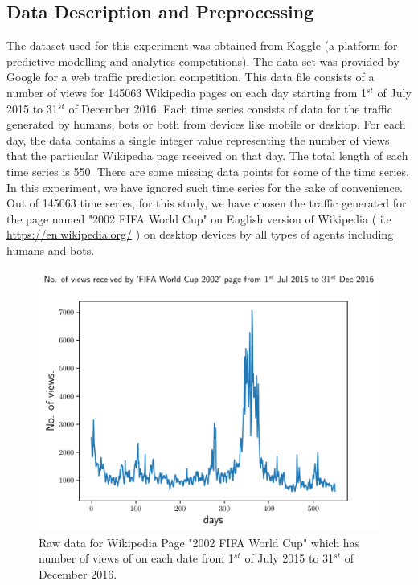 
  
  \subsection{Data Description and Preprocessing}
  
  \indent \indent
  		The dataset used for this experiment was obtained from Kaggle (a platform for predictive modelling and analytics competitions). The data set was provided by Google for a web traffic prediction competition.
		 This data file consists of  a number of views for 145063 Wikipedia pages on each day starting from 1$^{st}$ of July 2015 to 31$^{st}$ of December 2016. Each time series consists of data for the traffic generated by humans, bots or both from devices like mobile or desktop.
		 For each day, the data contains a single integer value representing the number of views that the particular Wikipedia page received on that day.  The total length of each time series is 550. There are some missing data points for some of the time series. In this experiment, we have ignored such time series for the sake of convenience. Out of 145063 time series, for this study, we have chosen the traffic generated for the  page named "2002 FIFA World Cup" on English version of Wikipedia ( i.e \url{https://en.wikipedia.org/} ) on desktop devices by all types of agents including humans and bots. \\
		 
		\begin{figure}
		     \centering
		     \includegraphics[width = 15cm]{./description/images/rawSignal}
			   
			   \caption{Raw data for Wikipedia Page "2002 FIFA World Cup"  which has number of views of on each date from 1$^{st}$ of July  2015 to 31$^{st}$ of December 2016. }
			\label{fig:raw}
			\end{figure}
			
